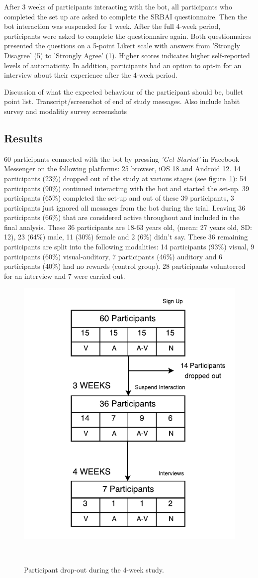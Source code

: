 After 3 weeks of participants interacting with the bot, all participants who completed the set up are asked to complete the SRBAI questionnaire. Then the bot interaction was suspended for 1 week. After the full 4-week period, participants were asked to complete the questionnaire again. Both questionnaires presented the questions on a 5-point Likert scale with answers from 'Strongly Disagree' (5) to 'Strongly Agree' (1). Higher scores indicates higher self-reported levels of automaticity. In addition, participants had an option to opt-in for an interview about their experience after the 4-week period.


Discussion of what the expected behaviour of the participant should be, bullet point list.\newline
Transcript/screenshot of end of study messages.\newline
Also include habit survey and modalitiy survey screenshots

\subsection{Results}
60 participants connected with the bot by pressing \textit{'Get Started'} in Facebook Messenger on the following platforms: 25 browser, iOS 18 and Android 12. 14 participants (23\%) dropped out of the study at various stages (see figure~\ref{fig:study_dropout}): 54 participants (90\%) continued interacting with the bot and started the set-up. 39 participants (65\%) completed the set-up and out of these 39 participants, 3 participants just ignored all messages from the bot during the trial. Leaving 36 participants (66\%) that are considered active throughout and included in the final analysis. These 36 participants are 18-63 years old, (mean: 27 years old, SD: 12), 23 (64\%) male, 11 (30\%) female and 2 (6\%) didn't say. These 36 remaining participants are split into the following modalities: 14 participants (93\%) visual, 9 participants (60\%) visual-auditory, 7 participants (46\%) auditory and 6 participants (40\%) had no rewards (control group). 28 participants volunteered for an interview and 7 were carried out.

\begin{figure}[H]
  \centering
  \includegraphics[width=.4\columnwidth]{resources/figures/study-flow.pdf}
  \caption{Participant drop-out during the 4-week study.}~\label{fig:study_dropout}
\end{figure}

